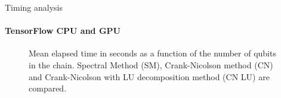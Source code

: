 \documentclass[8pt]{beamer}
\begin{document}
\begin{frame}[c]{Timing analysis}
\framesubtitle{TensorFlow CPU and GPU}
\begin{figure}[H]
\begin{minipage}[c]{0.49\linewidth}
\end{minipage}
\begin{minipage}[]{0.49\linewidth}
\centering
{}
\end{minipage}
\caption{Mean elapsed time in seconds as a function of the number of qubits in the chain. Spectral Method (SM), Crank-Nicolson method (CN) and Crank-Nicolson with LU decomposition method (CN LU) are compared.}
\label{fig:timing}
\end{figure}

\end{frame}
\end{document}
